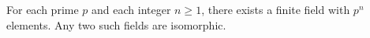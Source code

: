 For each prime $p$ and each integer $n \geq 1$, there exists a finite field with $p^n$ elements. Any two such fields are isomorphic.
